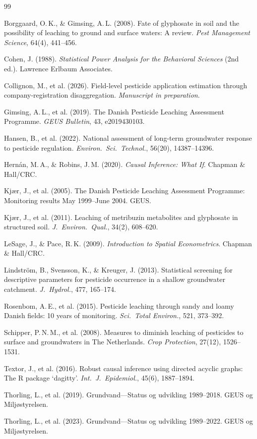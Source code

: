 \documentclass[12pt,a4paper]{article}
\begin{document}
\begin{thebibliography}{99}

 Borggaard, O.\,K., \& Gimsing, A.\,L. (2008). Fate of glyphosate in soil and the possibility of leaching to ground and surface waters: A review. \textit{Pest Management Science}, 64(4), 441--456.

 Cohen, J. (1988). \textit{Statistical Power Analysis for the Behavioral Sciences} (2nd ed.). Lawrence Erlbaum Associates.

 Collignon, M., et al. (2026). Field-level pesticide application estimation through company-registration disaggregation. \textit{Manuscript in preparation}.

 Gimsing, A.\,L., et al. (2019). The Danish Pesticide Leaching Assessment Programme. \textit{GEUS Bulletin}, 43, e2019430103.

 Hansen, B., et al. (2022). National assessment of long-term groundwater response to pesticide regulation. \textit{Environ.\ Sci.\ Technol.}, 56(20), 14387--14396.

 Hern\'an, M.\,A., \& Robins, J.\,M. (2020). \textit{Causal Inference: What If}. Chapman \& Hall/CRC.

 Kj\ae r, J., et al. (2005). The Danish Pesticide Leaching Assessment Programme: Monitoring results May 1999--June 2004. GEUS.

 Kj\ae r, J., et al. (2011). Leaching of metribuzin metabolites and glyphosate in structured soil. \textit{J.\ Environ.\ Qual.}, 34(2), 608--620.

 LeSage, J., \& Pace, R.\,K. (2009). \textit{Introduction to Spatial Econometrics}. Chapman \& Hall/CRC.

 Lindstr\"om, B., Svensson, K., \& Kreuger, J. (2013). Statistical screening for descriptive parameters for pesticide occurrence in a shallow groundwater catchment. \textit{J.\ Hydrol.}, 477, 165--174.

 Rosenbom, A.\,E., et al. (2015). Pesticide leaching through sandy and loamy Danish fields: 10 years of monitoring. \textit{Sci.\ Total Environ.}, 521, 373--392.

 Schipper, P.\,N.\,M., et al. (2008). Measures to diminish leaching of pesticides to surface and groundwaters in The Netherlands. \textit{Crop Protection}, 27(12), 1526--1531.

 Textor, J., et al. (2016). Robust causal inference using directed acyclic graphs: The R package `dagitty'. \textit{Int.\ J.\ Epidemiol.}, 45(6), 1887--1894.

 Thorling, L., et al. (2019). Grundvand---Status og udvikling 1989--2018. GEUS og Milj\o styrelsen.

 Thorling, L., et al. (2023). Grundvand---Status og udvikling 1989--2022. GEUS og Milj\o styrelsen.

\end{thebibliography}
\end{document}
